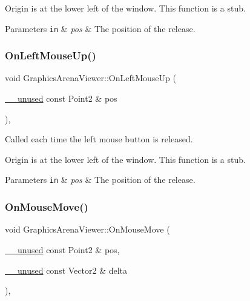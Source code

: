 Origin is at the lower left of the window. This function is a stub.


\begin{DoxyParams}[1]{Parameters}
\mbox{\tt in}  & {\em pos} & The position of the release. \\
\hline
\end{DoxyParams}
\mbox{\label{class_graphics_arena_viewer_abe4f11ab9bfb6055280ddf2b671d7032}} 
\subsubsection{\texorpdfstring{On\+Left\+Mouse\+Up()}{OnLeftMouseUp()}}
{\footnotesize\ttfamily void Graphics\+Arena\+Viewer\+::\+On\+Left\+Mouse\+Up (\begin{DoxyParamCaption}\item[{\mbox{\hyperlink{common_8h_a2e3484535ee610c8e19e9859563abe48}{\+\_\+\+\_\+unused}} const Point2 \&}]{pos }\end{DoxyParamCaption})\hspace{0.3cm}{\ttfamily [inline]}, {\ttfamily [override]}}



Called each time the left mouse button is released. 

Origin is at the lower left of the window. This function is a stub.


\begin{DoxyParams}[1]{Parameters}
\mbox{\tt in}  & {\em pos} & The position of the release. \\
\hline
\end{DoxyParams}
\mbox{\label{class_graphics_arena_viewer_a74b5c524369a62ba419c89677c646d9e}} 
\subsubsection{\texorpdfstring{On\+Mouse\+Move()}{OnMouseMove()}}
{\footnotesize\ttfamily void Graphics\+Arena\+Viewer\+::\+On\+Mouse\+Move (\begin{DoxyParamCaption}\item[{\mbox{\hyperlink{common_8h_a2e3484535ee610c8e19e9859563abe48}{\+\_\+\+\_\+unused}} const Point2 \&}]{pos,  }\item[{\mbox{\hyperlink{common_8h_a2e3484535ee610c8e19e9859563abe48}{\+\_\+\+\_\+unused}} const Vector2 \&}]{delta }\end{DoxyParamCaption})\hspace{0.3cm}{\ttfamily [inline]}, {\ttfamily [override]}}



